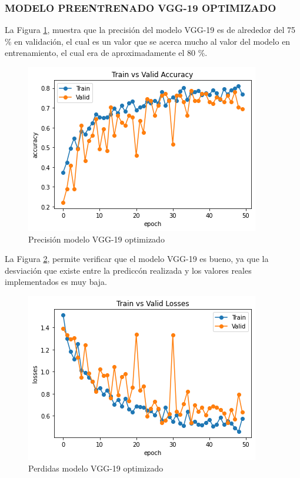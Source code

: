 \subsubsection{\MakeUppercase{Modelo preentrenado VGG-19 optimizado}}
La Figura \ref{fig:preci_vgg19_OPT}, muestra que la precisión del modelo VGG-19 es de alrededor del 75 \% en validación, el cual es un valor que se acerca mucho al valor del modelo en entrenamiento, el cual era de aproximadamente el 80 \%.
\begin{figure}[ht]
	\centering
	\includegraphics[scale=0.6]{Figs/504.png}
	\caption{Precisión modelo VGG-19 optimizado}
	\label{fig:preci_vgg19_OPT}
\end{figure}

La Figura \ref{fig:perdda_vgg19_opt}, permite verificar que el modelo VGG-19 es bueno, ya que la desviación que existe entre la prediccón realizada y los valores reales implementados es muy baja.


\begin{figure}[ht]
	\centering
	\includegraphics[scale=0.6]{Figs/505.png}
	\caption{Perdidas modelo VGG-19 optimizado}
	\label{fig:perdda_vgg19_opt}
\end{figure}

